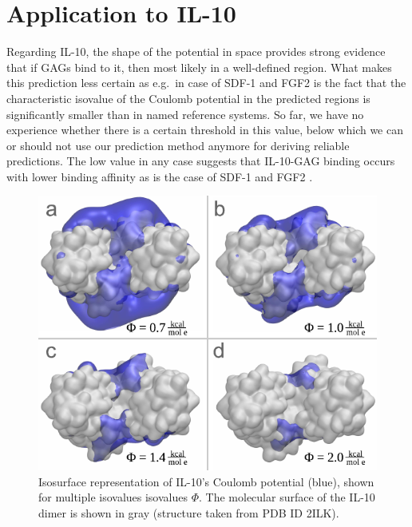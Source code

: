 


\section{Application to IL-10}

Regarding IL-10, the shape of the potential in space provides strong evidence
that if GAGs bind to it, then most likely in a well-defined region. What makes
this prediction less certain as e.g.\ in case of SDF-1 and FGF2 is the fact that
the characteristic isovalue of the Coulomb potential in the predicted regions is
significantly smaller than in named reference systems. So far, we have no
experience whether there is a certain threshold in this value, below which we
can or should not use our prediction method anymore for deriving reliable
predictions. The low value in any case suggests that IL-10-GAG binding occurs
with lower binding affinity as is the case of  SDF-1 and FGF2 .

\begin{figure}
\centering
\includegraphics[width=1.0\textwidth]{gfx/bspred/il10_top_coulomb_isosurfaces_different_values_03_ds.pdf}
\caption[]{
Isosurface representation of IL-10's Coulomb potential (blue), shown for
multiple isovalues isovalues $\Phi$. The molecular surface of the IL-10 dimer is
shown in gray (structure taken from PDB ID 2ILK).
}
\label{fig:bspred:il10_multi_iso}
\end{figure}


